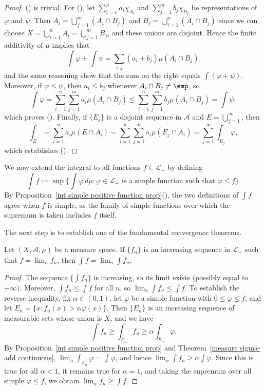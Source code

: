 \begin{proof}
() is trivial. For (), let $\sum_{i=1}^{n}a_i\chi_{A_i}$ and $\sum_{j=1}^{m}b_j\chi_{B_j}$ be representations of $\varphi$ and $\psi$. Then $A_i=\bigcup_{j=1}^{m}(A_i\cap B_j)$ and $B_j=\bigcup_{i=1}^{n}(A_i\cap B_j)$ since we can choose $X=\bigcup_{i=1}^{n}A_i=\bigcup_{j=1}^{m}B_j$, and these unions are disjoint. Hence the finite additivity of $\mu$ implies that
\[\int\varphi+\int\psi=\sum_{i,j}(a_i+b_j)\mu(A_i\cap B_j).\]
and the same reasoning show that the sum on the right equals $\int(\varphi+\psi)$. Moreover, if $\varphi\leq\psi$, then $a_i\leq b_j$ whenever $A_i\cap B_j\neq\emp$, so
\[\int\varphi=\sum_{i=1}^{n}\sum_{j=1}^{m}a_i\mu(A_i\cap B_j)\leq\sum_{i=1}^{n}\sum_{j=1}^{m}b_j\mu(A_i\cap B_j)=\int\psi,\]
which proves (). Finally, if $\{E_j\}$ is a disjoint sequence in $\mathcal{A}$ and $E=\bigcup_{j=1}^{\infty}$, then
\[\int_{E}=\sum_{i=1}^{n}a_i\mu(E\cap A_i)=\sum_{i=1}^{n}\sum_{j=1}^{\infty}a_i\mu(E_j\cap A_i)=\sum_{j=1}^{\infty}\int_{E_j}\varphi,\]
which establishes ().
\end{proof}
We now extend the integral to all functions $f\in\mathcal{L}_+$ by defining
\[\int f:=\sup\{\int\varphi\,d\mu:\text{$\varphi\in\mathcal{L}_+$ is a simple function such that $\varphi\leq f$}\}.\]
By Proposition~\ref{int simple positive function prop}(), the two definitions of $\int f$ agree when $f$ is simple, as the family of simple functions over which the supremum is taken includes $f$ itself.\par
The next step is to establish one of the fundamental convergence theorems.
\begin{proposition}\label{monotone convergence}
Let $(X,\mathcal{A},\mu)$ be a measure space. If $\{f_n\}$ is an increasing sequence in $\mathcal{L}_+$ such that $f=\lim_nf_n$, then $\int f=\lim_n\int f_n$.
\end{proposition}
\begin{proof}
The sequence $\{\int f_n\}$ is increasing, so its limit exists (possibly equal to $+\infty)$. Moreover, $\int f_n\leq\int f$ for all $n$, so $\lim_n\int f_n\leq\int f$. To establish the reverse inequality, fix $\alpha\in(0,1)$, let $\varphi$ be a simple function with $0\leq\varphi\leq f$, and let $E_n=\{x:f_n(x)>\alpha\varphi(x)\}$. Then $\{E_n\}$ is an increasing sequence of measurable sets whose union is $X$, and we have 
\[\int f_n\geq\int_{E_n}f_n\geq\alpha\int_{E_n}\varphi.\]
By Proposition~\ref{int simple positive function prop} and Theorem~\ref{measure sigma-add continuous}, $\lim_n\int_{E_n}\varphi=\int\varphi$, and hence $\lim_n\int f_n\geq\alpha\int\varphi$. Since this is true for all $\alpha<1$, it remains true for $\alpha=1$, and taking the supremum over all simple $\varphi\leq f$, we obtain $\lim_nf_n\geq\int f$.
\end{proof}

